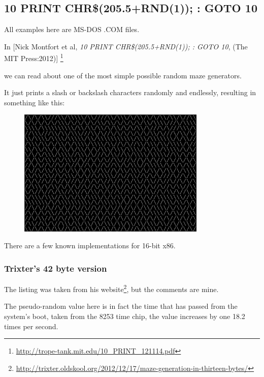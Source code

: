 \subsection{10 PRINT CHR\$(205.5+RND(1)); : GOTO 10}

All examples here are MS-DOS .COM files.

In [Nick Montfort et al, \emph{10 PRINT CHR\$(205.5+RND(1)); : GOTO 10}, (The MIT Press:2012)]
\footnote{\AlsoAvailableAs \url{http://trope-tank.mit.edu/10_PRINT_121114.pdf}}

we can read about one of the most simple possible random maze generators.

It just prints a slash or backslash characters randomly and endlessly, resulting in something like this:

\begin{figure}[H]
\centering
\includegraphics[width=0.8\textwidth]{examples/demos/10print/10print.png}
\end{figure}

There are a few known implementations for 16-bit x86.

\subsubsection{Trixter's 42 byte version}

\newcommand{\FNURLTRIXTER}{\footnote{\url{http://trixter.oldskool.org/2012/12/17/maze-generation-in-thirteen-bytes/}}}

The listing was taken from his website\FNURLTRIXTER, 
but the comments are mine.



The pseudo-random value here is in fact the time 
that has passed from the system's boot, taken from the 8253 time chip, the value increases by one 18.2 times per second.

